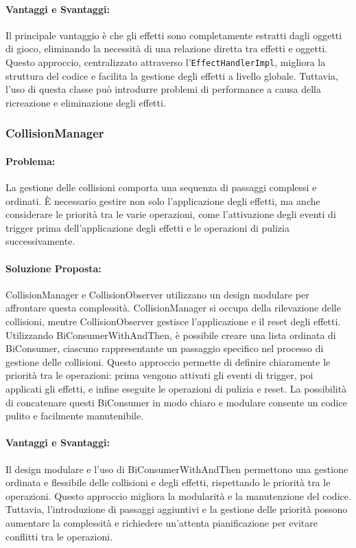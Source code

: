 \documentclass[a4paper,12pt]{report}
\begin{document}
\paragraph{Vantaggi e Svantaggi:}
Il principale vantaggio è che gli effetti sono completamente estratti dagli oggetti di gioco, eliminando la necessità di una relazione diretta tra effetti e oggetti. Questo approccio, centralizzato attraverso l’\texttt{EffectHandlerImpl}, migliora la struttura del codice e facilita la gestione degli effetti a livello globale. Tuttavia, l’uso di questa classe può introdurre problemi di performance a causa della ricreazione e eliminazione degli effetti.

\subsubsection{CollisionManager}
\paragraph{Problema:} La gestione delle collisioni comporta una sequenza di passaggi complessi e ordinati. È necessario gestire non solo l’applicazione degli effetti, ma anche considerare le priorità tra le varie operazioni, come l’attivazione degli eventi di trigger prima dell’applicazione degli effetti e le operazioni di pulizia successivamente. 
\paragraph{Soluzione Proposta:}  CollisionManager e CollisionObserver utilizzano un design modulare per affrontare questa complessità. CollisionManager si occupa della rilevazione delle collisioni, mentre CollisionObserver gestisce l’applicazione e il reset degli effetti. Utilizzando BiConsumerWithAndThen, è possibile creare una lista ordinata di BiConsumer, ciascuno rappresentante un passaggio specifico nel processo di gestione delle collisioni. Questo approccio permette di definire chiaramente le priorità tra le operazioni: prima vengono attivati gli eventi di trigger, poi applicati gli effetti, e infine eseguite le operazioni di pulizia e reset. La possibilità di concatenare questi BiConsumer in modo chiaro e modulare consente un codice pulito e facilmente manutenibile.
\paragraph{Vantaggi e Svantaggi:} Il design modulare e l’uso di BiConsumerWithAndThen permettono una gestione ordinata e flessibile delle collisioni e degli effetti, rispettando le priorità tra le operazioni. Questo approccio migliora la modularità e la manutenzione del codice. Tuttavia, l’introduzione di passaggi aggiuntivi e la gestione delle priorità possono aumentare la complessità e richiedere un’attenta pianificazione per evitare conflitti tra le operazioni.
\end{document}
